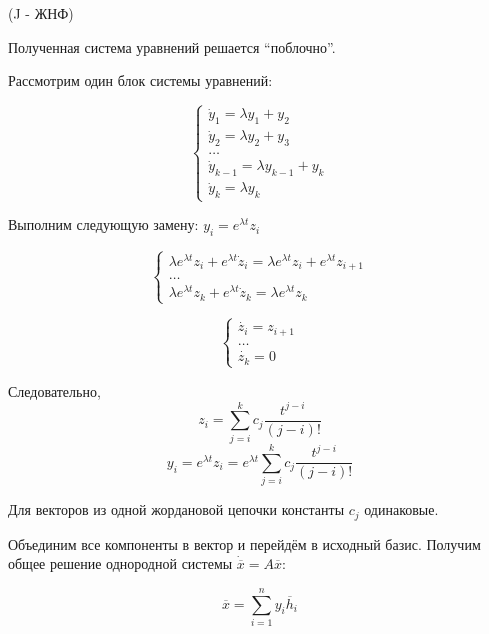 (J - ЖНФ)

Полученная система уравнений решается “поблочно”.

Рассмотрим один блок системы уравнений:

\begin{equation*}
 \begin{cases}
    \dot{y}_1 = \lambda y_1 + y_2\\
    \dot{y}_2 = \lambda y_2 + y_3\\
    \dots\\
    \dot{y}_{k-1} = \lambda y_{k-1} + y_k\\
    \dot{y}_k = \lambda y_k
 \end{cases}
\end{equation*}

Выполним следующую замену: $y_i = e^{\lambda t} z_i$

\begin{equation*}
 \begin{cases}
    \lambda e^{\lambda t} z_i + e^{\lambda t} \dot{z}_i = \lambda e^{\lambda t} z_i +  e^{\lambda t} z_{i+1}\\
    \dots\\
    \lambda e^{\lambda t} z_k + e^{\lambda t} \dot{z}_k = \lambda e^{\lambda t} z_k
 \end{cases}
\end{equation*}

\begin{equation*}
 \begin{cases}
    \dot{z_i} = z_{i+1}\\
    \dots\\
    \dot{z_k} = 0
 \end{cases}
\end{equation*}

Следовательно,
$$z_i = \sum_{j=i}^k c_j \frac{t^{j-i}}{(j - i)!}$$
$$y_i = e^{\lambda t} z_i = e^{\lambda t} \sum_{j=i}^k c_j \frac{t^{j-i}}{(j - i)!}$$

Для векторов из одной жордановой цепочки константы $c_j$ одинаковые.

Объединим все компоненты в вектор и перейдём в исходный базис. Получим общее решение однородной системы $\dot{\overline{x}} = A \overline{x}$:

$$\overline{x} = \sum_{i=1}^n y_i \overline{h}_i$$